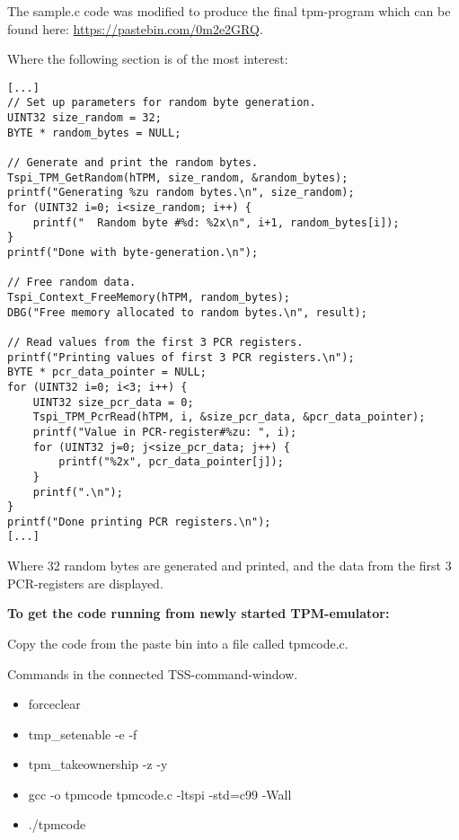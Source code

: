 \documentclass[10pt]{article}
\begin{document}
The sample.c code was modified to produce the final tpm-program which can be
found here: \url{https://pastebin.com/0m2e2GRQ}.

Where the following section is of the most interest:

\begin{lstlisting}
[...]
// Set up parameters for random byte generation.
UINT32 size_random = 32;
BYTE * random_bytes = NULL;

// Generate and print the random bytes.
Tspi_TPM_GetRandom(hTPM, size_random, &random_bytes);
printf("Generating %zu random bytes.\n", size_random);
for (UINT32 i=0; i<size_random; i++) {
    printf("  Random byte #%d: %2x\n", i+1, random_bytes[i]);
}
printf("Done with byte-generation.\n");

// Free random data.
Tspi_Context_FreeMemory(hTPM, random_bytes);
DBG("Free memory allocated to random bytes.\n", result);

// Read values from the first 3 PCR registers.
printf("Printing values of first 3 PCR registers.\n");
BYTE * pcr_data_pointer = NULL;
for (UINT32 i=0; i<3; i++) {
    UINT32 size_pcr_data = 0;
    Tspi_TPM_PcrRead(hTPM, i, &size_pcr_data, &pcr_data_pointer);
    printf("Value in PCR-register#%zu: ", i);
    for (UINT32 j=0; j<size_pcr_data; j++) {
        printf("%2x", pcr_data_pointer[j]);
    }
    printf(".\n");
}
printf("Done printing PCR registers.\n");
[...]
\end{lstlisting}

Where 32 random bytes are generated and printed, and the data from the first 3 PCR-registers
are displayed.

\textbf{To get the code running from newly started TPM-emulator:}

Copy the code from the paste bin into a file called tpmcode.c.

Commands in the connected TSS-command-window.
\begin{itemize}
  \item{forceclear}
  \item{tmp\_setenable -e -f}
  \item{tpm\_takeownership -z -y}
  \item{gcc -o tpmcode tpmcode.c -ltspi -std=c99 -Wall}
  \item{./tpmcode}
\end{itemize}
\end{document}
